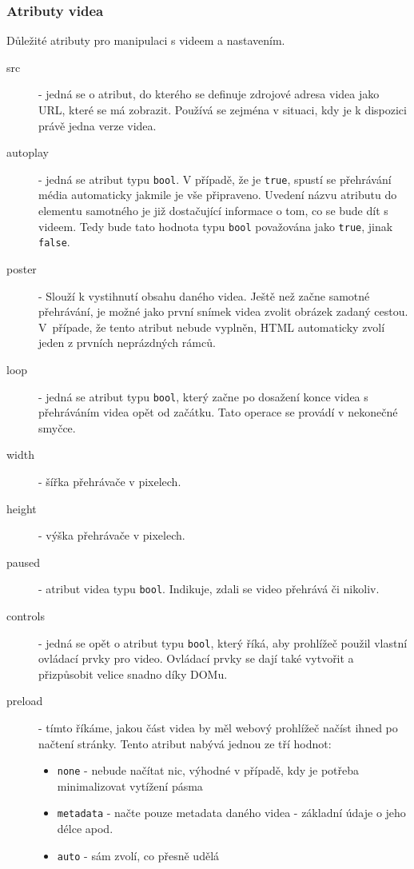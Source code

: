 \newpage

\subsubsection{Atributy videa}
Důležité atributy pro manipulaci s videem a nastavením.



\begin{description}
	\item[src] - jedná se o atribut, do kterého se definuje zdrojové adresa videa jako URL, které se má zobrazit. Používá se zejména v situaci, kdy je k dispozici právě jedna verze videa.
	
	\item[autoplay] - jedná se atribut typu \texttt{bool}. V případě, že je \texttt{true}, spustí se přehrávání média automaticky jakmile je vše připraveno. Uvedení názvu atributu do elementu samotného je již dostačující informace o tom, co se bude dít s videem. Tedy bude tato hodnota typu \texttt{bool} považována jako \texttt{true}, jinak \texttt{false}.	
	
	\item[poster]  - Slouží k vystihnutí obsahu daného videa. Ještě než začne samotné přehrávání, je možné jako první snímek videa zvolit obrázek zadaný cestou. V~případe, že tento atribut nebude vyplněn, HTML automaticky zvolí jeden z prvních neprázdných rámců.
	
	\item[loop]  - jedná se atribut typu \texttt{bool}, který začne po dosažení konce videa s přehráváním videa opět od začátku. Tato operace se provádí v nekonečné smyčce.

	\item[width] - šířka přehrávače v pixelech.
	
	\item[height] - výška přehrávače v pixelech.

	\item[paused] - atribut videa typu \texttt{bool}. Indikuje, zdali se video přehrává či nikoliv.

	\item[controls] - jedná se opět o atribut typu \texttt{bool}, který říká, aby prohlížeč použil vlastní ovládací prvky pro video. Ovládací prvky se dají také vytvořit a přizpůsobit velice snadno díky DOMu.
 	
 	\item[preload]  - tímto říkáme, jakou část videa by měl webový prohlížeč načíst ihned po načtení stránky. Tento atribut nabývá jednou ze tří hodnot:
	 	\begin{itemize}
	 		\item \texttt{none} - nebude načítat nic, výhodné v případě, kdy je potřeba minimalizovat vytížení pásma	 		
	 		\item \texttt{metadata} - načte pouze metadata daného videa - základní údaje o jeho délce apod.
	 		\item \texttt{auto} - sám zvolí, co přesně udělá 
	 	\end{itemize}
\end{description}

